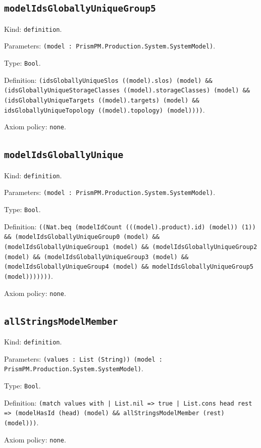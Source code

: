\documentclass[11pt]{article}
\begin{document}
\subsection*{\texttt{modelIdsGloballyUniqueGroup5}}
\noindent Kind: \texttt{definition}.\par
\noindent Parameters: \texttt{(model : PrismPM.Production.System.SystemModel)}.\par
\noindent Type: \texttt{Bool}.\par
\noindent Definition: \texttt{(idsGloballyUniqueSlos ((model).slos) (model) \&\& (idsGloballyUniqueStorageClasses ((model).storageClasses) (model) \&\& (idsGloballyUniqueTargets ((model).targets) (model) \&\& idsGloballyUniqueTopology ((model).topology) (model))))}.\par
\noindent Axiom policy: \texttt{none}.\par
\subsection*{\texttt{modelIdsGloballyUnique}}
\noindent Kind: \texttt{definition}.\par
\noindent Parameters: \texttt{(model : PrismPM.Production.System.SystemModel)}.\par
\noindent Type: \texttt{Bool}.\par
\noindent Definition: \texttt{((Nat.beq (modelIdCount (((model).product).id) (model)) (1)) \&\& (modelIdsGloballyUniqueGroup0 (model) \&\& (modelIdsGloballyUniqueGroup1 (model) \&\& (modelIdsGloballyUniqueGroup2 (model) \&\& (modelIdsGloballyUniqueGroup3 (model) \&\& (modelIdsGloballyUniqueGroup4 (model) \&\& modelIdsGloballyUniqueGroup5 (model)))))))}.\par
\noindent Axiom policy: \texttt{none}.\par
\subsection*{\texttt{allStringsModelMember}}
\noindent Kind: \texttt{definition}.\par
\noindent Parameters: \texttt{(values : List (String)) (model : PrismPM.Production.System.SystemModel)}.\par
\noindent Type: \texttt{Bool}.\par
\noindent Definition: \texttt{(match values with | List.nil => true | List.cons head rest => (modelHasId (head) (model) \&\& allStringsModelMember (rest) (model)))}.\par
\noindent Axiom policy: \texttt{none}.\par
\end{document}
